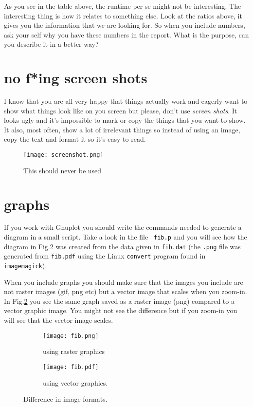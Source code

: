 \documentclass[a4paper,11pt]{article}
\begin{document}
As you see in the table above, the runtime per se might not be
interesting. The interesting thing is how it relates to something
else. Look at the ratios above, it gives you the information that we
are looking for. So when you include numbers, ask your self why you
have these numbers in the report. What is the purpose, can you
describe it in a better way?


\section*{no f*ing screen shots}

I know that you are all very happy that things actually work and
eagerly want to show what things look like on you screen but please,
don't use {\em screen shots}. It looks ugly and it's impossible to mark or
copy the things that you want to show. It also, most often, show a lot
of irrelevant things so instead of using an image, copy the text and
format it so it's easy to read.

\begin{figure}
  \centering
  \texttt{[image: screenshot.png]}
  \label{fig:screenshot}
  \caption{This should never be used}
\end{figure}



\section*{graphs}


If you work with Gnuplot you should write the commands needed to
generate a diagram in a small script. Take a look in the file {\tt
  fib.p} and you will see how the diagram in Fig.\ref{fig:images} was
created from the data given in {\tt fib.dat} (the {\tt .png} file was
generated from {\tt fib.pdf} using the Linux {\tt convert}
program found in {\tt imagemagick}).

When you include graphs you should make sure that the images you
include are not raster images (gif, png etc) but a vector image that
scales when you zoom-in. In Fig.\ref{fig:images} you see the same
graph saved as a raster image (png) compared to a vector graphic
image. You might not see the difference but if you zoom-in you will
see that the vector image scales.

\begin{figure}[h]
  \centering
  \begin{subfigure}{.5\textwidth}
    \centering
    \texttt{[image: fib.png]}
    \caption{using raster graphics}
  \end{subfigure}%
  \begin{subfigure}{.5\textwidth}
    \centering
    \texttt{[image: fib.pdf]}
    \caption{using vector graphics.}
  \end{subfigure}
  \caption{Difference in image formats.}
  \label{fig:images}
\end{figure}
\end{document}
